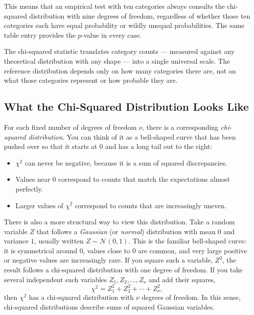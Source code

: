 This means that an empirical test with ten categories always consults the
chi-squared distribution with nine degrees of freedom, regardless of whether
those ten categories each have equal probability or wildly unequal
probabilities.  The same table entry provides the $p$-value in every case.
 
\begin{keyidea}
The chi-squared statistic translates category counts --- measured against
any theoretical distribution with any shape --- into a single universal
scale.  The reference distribution depends only on how many categories there
are, not on what those categories represent or how probable they are.
\end{keyidea}
 
\subsection{What the Chi-Squared Distribution Looks Like}

For each fixed number of degrees of freedom $\nu$, there is a corresponding
\emph{chi-squared distribution}.  You can think of it as a bell-shaped
curve that has been pushed over so that it starts at $0$ and has a long
tail out to the right:
\begin{itemize}
  \item $\chi^2$ can never be negative, because it is a sum of squared
        discrepancies.
  \item Values near $0$ correspond to counts that match the expectations
        almost perfectly.
  \item Larger values of $\chi^2$ correspond to counts that are
        increasingly uneven.
\end{itemize}

There is also a more structural way to view this distribution.  Take a
random variable $Z$ that follows a \emph{Gaussian} (or \emph{normal})
distribution with mean $0$ and variance $1$, usually written
$Z \sim \mathcal{N}(0,1)$.  This is the familiar bell-shaped curve: it is
symmetrical around $0$, values close to $0$ are common, and very large
positive or negative values are increasingly rare.  If you square such a
variable, $Z^2$, the result follows a chi-squared distribution with
one degree of freedom.  If you take several independent such variables
$Z_1, Z_2, \dots, Z_\nu$ and add their squares,
\[
  \chi^2 = Z_1^2 + Z_2^2 + \cdots + Z_\nu^2,
\]
then $\chi^2$ has a chi-squared distribution with $\nu$ degrees of
freedom.  In this sense, chi-squared distributions describe sums of
squared Gaussian variables.

